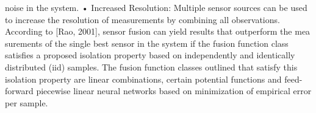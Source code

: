 noise in the system.
• Increased Resolution: Multiple sensor sources can be used to increase the resolution of measurements by combining all observations.
According to [Rao, 2001], sensor fusion can yield results that outperform the mea
surements of the single best sensor in the system if the fusion function class satisﬁes a
proposed isolation property based on independently and identically distributed (iid)
samples. The fusion function classes outlined that satisfy this isolation property
are linear combinations, certain potential functions and feed-forward piecewise linear
neural networks based on minimization of empirical error per sample.


